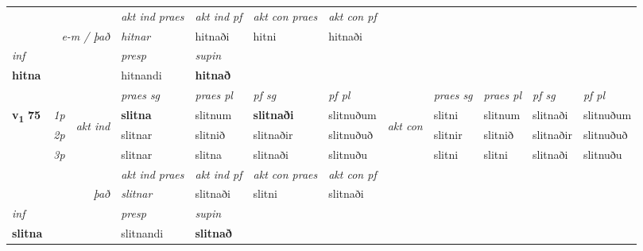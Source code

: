 \begin{longtable}[l]{X>{\footnotesize\itshape}llXXXXlXXXX}
   && &  \textit{akt ind praes} & \textit{akt ind pf} & \textit{akt con praes} & \textit{akt con pf} \\*
\multicolumn{3}{r}{\textit{e-m / það}} & hitnar & hitnaði & hitni & hitnaði \\*

\cmidrule{4-7}
   {\textit{inf}} & &     & \textit{presp} & \textit{supin}   \\*
  {\textbf{hitna}} & &     & hitnandi &  \textbf{hitnað}   \\*

\midrule

 & &   & \textit{praes sg}  & \textit{praes pl}    & \textit{ pf sg} & \textit{pf pl} & & \textit{praes sg}  & \textit{praes pl}    & \textit{pf sg} & \textit{pf pl }  \\ \cmidrule{4-7} \cmidrule{9-12}
 \multirow{2}{*}{{{\textbf{v{\textsubscript{1}}} \Large{\textbf{75}}}}}  & 1p & \multirow{3}{*}{\begin{turn}{90}\textit{akt ind}\end{turn}} & \textbf{slitna} & slitnum & \textbf{slitnaði} & slitnuðum & \multirow{3}{*}{\begin{turn}{90}\textit{akt con}\end{turn}} &slitni & slitnum & slitnaði & slitnuðum\\*
 & 2p &  &  slitnar  & slitnið & slitnaðir & slitnuðuð & & slitnir & slitnið & slitnaðir & slitnuðuð \\*
 & 3p &  & slitnar & slitna & slitnaði & slitnuðu & & slitni & slitni& slitnaði & slitnuðu \\*
\cmidrule{4-7} \cmidrule{9-12}

   && &  \textit{akt ind praes} & \textit{akt ind pf} & \textit{akt con praes} & \textit{akt con pf} \\*
\multicolumn{3}{r}{\textit{það}} & slitnar & slitnaði & slitni & slitnaði \\*

\cmidrule{4-7}
   {\textit{inf}} & &     & \textit{presp} & \textit{supin}   \\*
  {\textbf{slitna}} & &     & slitnandi &  \textbf{slitnað}   \\*

\midrule


\end{longtable}

